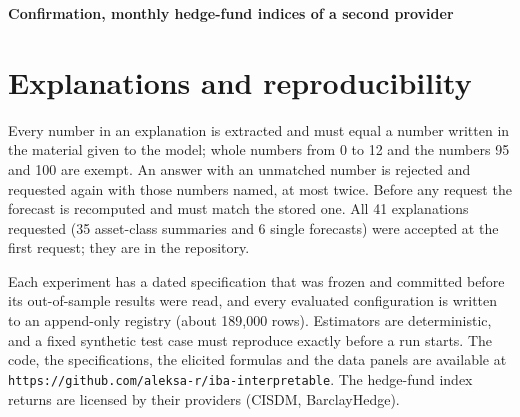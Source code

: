 \documentclass[review]{elsarticle}
\begin{document}
\medskip\noindent \textbf{Confirmation, monthly hedge-fund indices of a second provider}







\section{Explanations and reproducibility}\label{app:F}

\setcounter{table}{0}

Every number in an explanation is extracted and must equal a number written in the material given to the model; whole numbers from 0 to 12 and the numbers 95 and 100 are exempt. An answer with an unmatched number is rejected and requested again with those numbers named, at most twice. Before any request the forecast is recomputed and must match the stored one. All 41 explanations requested (35 asset-class summaries and 6 single forecasts) were accepted at the first request; they are in the repository.



Each experiment has a dated specification that was frozen and committed before its out-of-sample results were read, and every evaluated configuration is written to an append-only registry (about 189,000 rows). Estimators are deterministic, and a fixed synthetic test case must reproduce exactly before a run starts. The code, the specifications, the elicited formulas and the data panels are available at \texttt{https:/\allowbreak{}/\allowbreak{}github.com/\allowbreak{}aleksa-r/\allowbreak{}iba-interpretable}. The hedge-fund index returns are licensed by their providers (CISDM, BarclayHedge).




\end{document}
